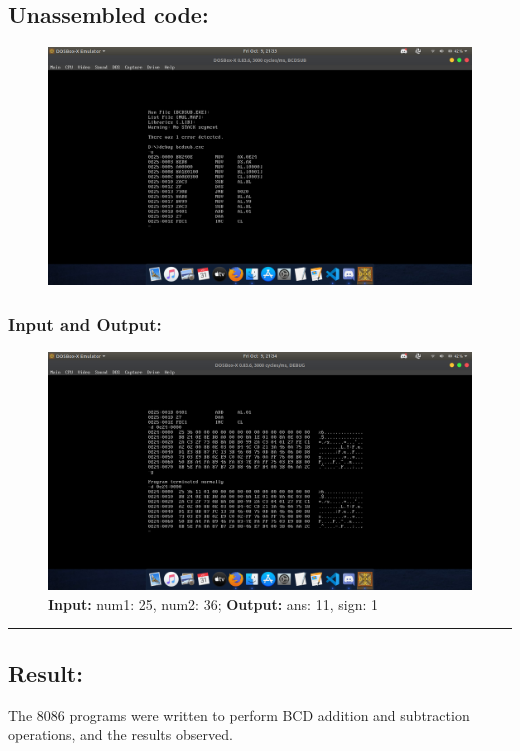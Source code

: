 \documentclass[10pt,a4paper]{article}
\begin{document}
\begin{flushleft}
\newpage
\subsection*{\textbf{Unassembled code:}}
\begin{figure}[h]
    \centering
    \includegraphics[trim = 100mm 60mm 200mm 120mm, clip, width = \textwidth]{Pics/BSUS.png}
\end{figure}
\subsubsection*{\textbf{Input and Output:}}
\begin{figure}[h]
    \centering
    \includegraphics[trim = 100mm 60mm 100mm 80mm, clip, width = \textwidth]{Pics/BSIO.png}
    \caption{ \textbf{Input:} num1: 25, num2: 36; \newline \hspace{1cm}
                \textbf{Output:} ans: 11, sign: 1}
\end{figure}
\hrule
\subsection*{\textbf{Result:}}
The 8086 programs were written to perform BCD addition and subtraction operations, and the results observed.
\end{flushleft}
\end{document}
